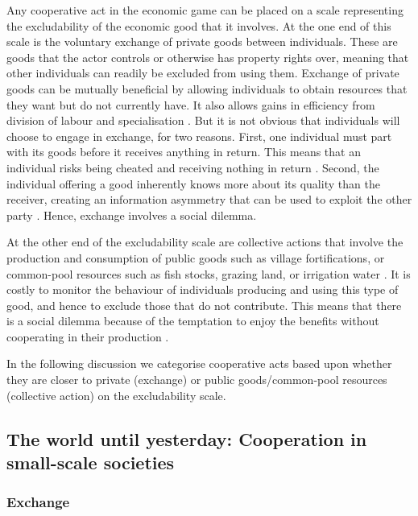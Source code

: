 \documentclass[10pt, a4paper, fleqn]{article}
\begin{document}
Any cooperative act in the economic game can be placed on a scale representing the excludability of the economic good that it involves. At the one end of this scale is the voluntary exchange of private goods between individuals. These are goods that the actor controls or otherwise has property rights over, meaning that other individuals can readily be excluded from using them. Exchange of private goods can be mutually beneficial by allowing individuals to obtain resources that they want but do not currently have. It also allows gains in efficiency from division of labour and specialisation \citep{North:1990:a,Greif:2006:a}. But it is not obvious that individuals will choose to engage in exchange, for two reasons. First, one individual must part with its goods before it receives anything in return. This means that an individual risks being cheated and receiving nothing in return \citep{Greif:2000:a}. Second, the individual offering a good inherently knows more about its quality than the receiver, creating an information asymmetry that can be used to exploit the other party \citep{North:1990:a}. Hence, exchange involves a social dilemma. 

At the other end of the excludability scale are collective actions that involve the production and consumption of public goods such as village fortifications, or common-pool resources such as fish stocks, grazing land, or irrigation water \citep{Hardin:1968:a,Ostrom:1990:a}. It is costly to monitor the behaviour of individuals producing and using this type of good, and hence to exclude those that do not contribute. This means that there is a social dilemma because of the temptation to enjoy the benefits without cooperating in their production \citep{Olson:1965:a}. 

In the following discussion we categorise cooperative acts based upon whether they are closer to private (exchange) or public goods/common-pool resources (collective action) on the excludability scale. 

\subsection*{The world until yesterday: Cooperation in small-scale societies}

\subsubsection*{Exchange}
\end{document}
